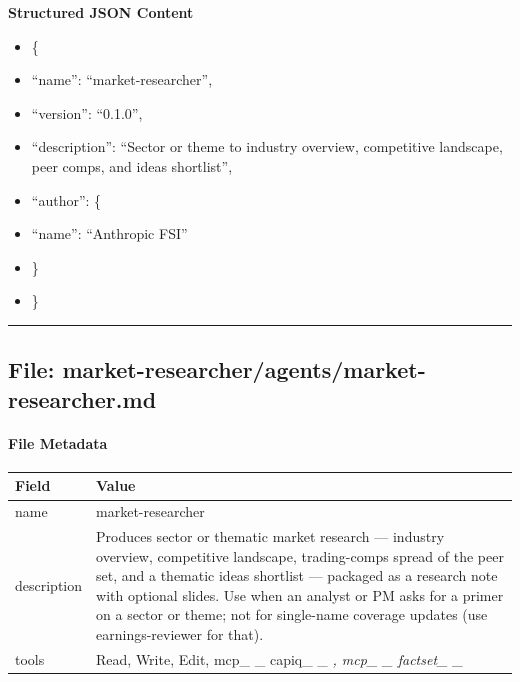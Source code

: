 \documentclass[11pt]{article}
\begin{document}
\textbf{Structured JSON Content}
\begin{itemize}[leftmargin=*,itemsep=2pt,topsep=2pt]
\item {} \{
\item {} ``name'': ``market-researcher'',
\item {} ``version'': ``0.1.0'',
\item {} ``description'': ``Sector or theme to industry overview, competitive landscape, peer comps, and ideas shortlist'',
\item {} ``author'': \{
\item {} ``name'': ``Anthropic FSI''
\item {} \}
\item {} \}
\end{itemize}

\vspace{0.8em}\hrule\vspace{0.8em}

\subsection{File: market-researcher/agents/market-researcher.md}\label{file:market-researcher-agents-market-researcher-md}

\paragraph{File Metadata}\mbox{}\par
\begingroup
\small
\setlength{\tabcolsep}{2pt}
\begin{longtable}{>{\RaggedRight\arraybackslash\hspace{0pt}}p{}>{\RaggedRight\arraybackslash\hspace{0pt}}p{}}
\toprule
{} \textbf{Field} & \textbf{Value} \\
\midrule
{} name & market-researcher \\
{} description & Produces sector or thematic market research — industry overview, competitive landscape, trading-comps spread of the peer set, and a thematic ideas shortlist — packaged as a research note with optional slides. Use when an analyst or PM asks for a primer on a sector or theme; not for single-name coverage updates (use earnings-reviewer for that). \\
{} tools & Read, Write, Edit, mcp\_\allowbreak{} \_\allowbreak{} capiq\_\allowbreak{} \_\allowbreak{} \emph{, mcp\_\allowbreak{} \_\allowbreak{} factset\_\allowbreak{} \_\allowbreak{} } \\
\bottomrule
\end{longtable}
\endgroup
\end{document}
